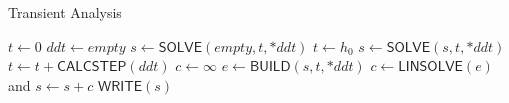 \begin{algorithm}[ht]
    \caption{Transient Analysis}
    \begin{algorithmic}[1]
            \State $t \gets 0$
            \State $ddt \gets empty$ 
            \State $s \gets \textsf{SOLVE}(empty,t,*ddt)$ 
            \State $t \gets h_0$
                \State $s \gets \textsf{SOLVE}(s,t,*ddt)$
                \State $t \gets t + \textsf{CALCSTEP}(ddt)$
            \EndWhile
        \EndProcedure
            \State $c \gets \infty$
                \State $e \gets \textsf{BUILD}(s,t,*ddt)$
                \State $c \gets \textsf{LINSOLVE}(e)$ and $s \gets s + c$
            \EndWhile
            \State $\textsf{WRITE}(s)$
        \EndProcedure
    \end{algorithmic}
\end{algorithm}
